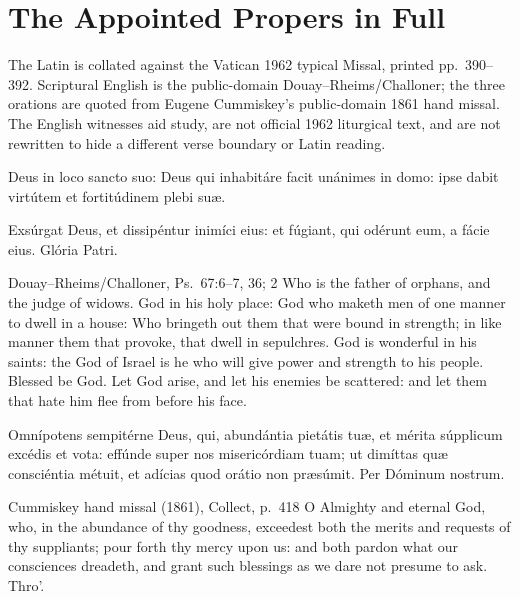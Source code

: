 \section*{The Appointed Propers in Full}

\noindent The Latin is collated against the Vatican 1962 typical Missal,
printed pp.~390--392. Scriptural English is the public-domain
Douay--Rheims/Challoner; the three orations are quoted from Eugene
Cummiskey's public-domain 1861 hand missal. The English witnesses aid study,
are not official 1962 liturgical text, and are not rewritten to hide a
different verse boundary or Latin reading.

Deus in loco sancto suo: Deus qui inhabitáre facit unánimes in domo: ipse
dabit virtútem et fortitúdinem plebi suæ.

\medskip\noindent{} Exsúrgat Deus, et dissipéntur inimíci eius:
et fúgiant, qui odérunt eum, a fácie eius.  Glória Patri.
\finishfulltextelement
\begin{fulltextenglish}{Douay--Rheims/Challoner, Ps.~67:6--7, 36; 2}
Who is the father of orphans, and the judge of widows. God in his holy place:
God who maketh men of one manner to dwell in a house: Who bringeth out them
that were bound in strength; in like manner them that provoke, that dwell in
sepulchres. God is wonderful in his saints: the God of Israel is he who will
give power and strength to his people. Blessed be God. Let God arise, and let
his enemies be scattered: and let them that hate him flee from before his
face.
\end{fulltextenglish}

Omnípotens sempitérne Deus, qui, abundántia pietátis tuæ, et mérita súpplicum
excédis et vota: effúnde super nos misericórdiam tuam; ut dimíttas quæ
consciéntia métuit, et adícias quod orátio non præsúmit. Per Dóminum nostrum.
\finishfulltextelement
\begin{fulltextenglish}{Cummiskey hand missal (1861), Collect, p.~418}
O Almighty and eternal God, who, in the abundance of thy goodness, exceedest
both the merits and requests of thy suppliants; pour forth thy mercy upon us:
and both pardon what our consciences dreadeth, and grant such blessings as we
dare not presume to ask. Thro'.
\end{fulltextenglish}

